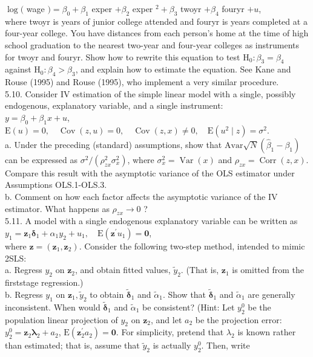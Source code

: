 \documentclass[10pt]{article}
\begin{document}
$\log ($ wage $)=\beta_{0}+\beta_{1}$ exper $+\beta_{2}$ exper $^{2}+\beta_{3}$ twoyr $+\beta_{4}$ fouryr $+u$,\\
where twoyr is years of junior college attended and fouryr is years completed at a four-year college. You have distances from each person's home at the time of high school graduation to the nearest two-year and four-year colleges as instruments for twoyr and fouryr. Show how to rewrite this equation to test $\mathrm{H}_{0}: \beta_{3}=\beta_{4}$ against $\mathrm{H}_{0}: \beta_{4}>\beta_{3}$, and explain how to estimate the equation. See Kane and Rouse (1995) and Rouse (1995), who implement a very similar procedure.\\
5.10. Consider IV estimation of the simple linear model with a single, possibly endogenous, explanatory variable, and a single instrument:\\
$y=\beta_{0}+\beta_{1} x+u$,\\
$\mathrm{E}(u)=0, \quad \operatorname{Cov}(z, u)=0, \quad \operatorname{Cov}(z, x) \neq 0, \quad \mathrm{E}\left(u^{2} \mid z\right)=\sigma^{2}$.\\
a. Under the preceding (standard) assumptions, show that $\mathrm{Avar} \sqrt{N}\left(\hat{\beta}_{1}-\beta_{1}\right)$ can be expressed as $\sigma^{2} /\left(\rho_{z x}^{2} \sigma_{x}^{2}\right)$, where $\sigma_{x}^{2}=\operatorname{Var}(x)$ and $\rho_{z x}=\operatorname{Corr}(z, x)$. Compare this result with the asymptotic variance of the OLS estimator under Assumptions OLS.1-OLS.3.\\
b. Comment on how each factor affects the asymptotic variance of the IV estimator. What happens as $\rho_{z x} \rightarrow 0$ ?\\
5.11. A model with a single endogenous explanatory variable can be written as\\
$y_{1}=\mathbf{z}_{1} \boldsymbol{\delta}_{1}+\alpha_{1} y_{2}+u_{1}, \quad \mathrm{E}\left(\mathbf{z}^{\prime} u_{1}\right)=\mathbf{0}$,\\
where $\mathbf{z}=\left(\mathbf{z}_{1}, \mathbf{z}_{2}\right)$. Consider the following two-step method, intended to mimic 2SLS:\\
a. Regress $y_{2}$ on $\mathbf{z}_{2}$, and obtain fitted values, $\tilde{y}_{2}$. (That is, $\mathbf{z}_{1}$ is omitted from the firststage regression.)\\
b. Regress $y_{1}$ on $\mathbf{z}_{1}, \tilde{y}_{2}$ to obtain $\tilde{\boldsymbol{\delta}}_{1}$ and $\tilde{\alpha}_{1}$. Show that $\tilde{\boldsymbol{\delta}}_{1}$ and $\tilde{\alpha}_{1}$ are generally inconsistent. When would $\tilde{\boldsymbol{\delta}}_{1}$ and $\tilde{\alpha}_{1}$ be consistent? (Hint: Let $y_{2}^{0}$ be the population linear projection of $y_{2}$ on $\mathbf{z}_{2}$, and let $a_{2}$ be the projection error: $y_{2}^{0}=\mathbf{z}_{2} \boldsymbol{\lambda}_{2}+a_{2}$, $\mathrm{E}\left(\mathbf{z}_{2}^{\prime} a_{2}\right)=\mathbf{0}$. For simplicity, pretend that $\lambda_{2}$ is known rather than estimated; that is, assume that $\tilde{y}_{2}$ is actually $y_{2}^{0}$. Then, write\\
\end{document}
